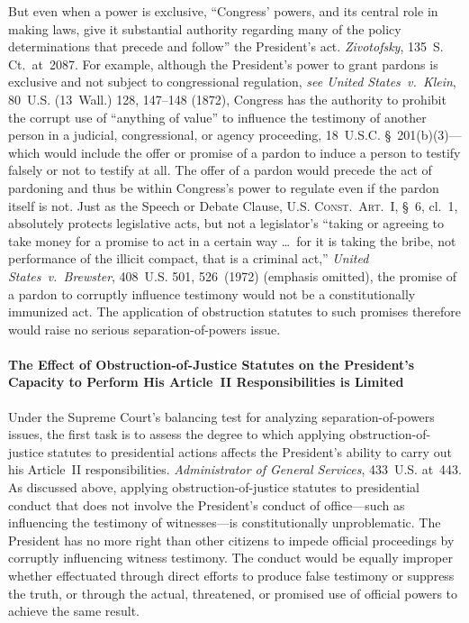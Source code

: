 But even when a power is exclusive, ``Congress' powers, and its central role in making laws, give it substantial authority regarding many of the policy determinations that precede and follow'' the President's act.
\textit{Zivotofsky}, 135~S. Ct.~at~2087.
For example, although the President's power to grant pardons is exclusive and not subject to congressional regulation, \textit{see United States~v.\ Klein}, 80~U.S. (13~Wall.) 128, 147--148 (1872), Congress has the authority to prohibit the corrupt use of ``anything of value'' to influence the testimony of another person in a judicial, congressional, or agency proceeding, 18~U.S.C. \S~201(b)(3)---which would include the offer or promise of a pardon to induce a person to testify falsely or not to testify at all.
The offer of a pardon would precede the act of pardoning and thus be within Congress's power to regulate even if the pardon itself is not.
Just as the Speech or Debate Clause, \textsc{U.S. Const.\ Art.~I}, \S~6, cl.~1, absolutely protects legislative acts, but not a legislator's ``taking or agreeing to take money for a promise to act in a certain way \dots\ for it is taking the bribe, not performance of the illicit compact, that is a criminal act,'' \textit{United States~v.\ Brewster}, 408~U.S. 501, 526~(1972) (emphasis omitted), the promise of a pardon to corruptly influence testimony would not be a constitutionally immunized act.
The application of obstruction statutes to such promises therefore would raise no serious separation-of-powers issue.

\paragraph{The Effect of Obstruction-of-Justice Statutes on the President's Capacity to Perform His Article~II Responsibilities is Limited}

Under the Supreme Court's balancing test for analyzing separation-of-powers issues, the first task is to assess the degree to which applying obstruction-of-justice statutes to presidential actions affects the President's ability to carry out his Article~II responsibilities.
\textit{Administrator of General Services}, 433~U.S. at~443.
As discussed above, applying obstruction-of-justice statutes to presidential conduct that does not involve the President's conduct of office---such as influencing the testimony of witnesses---is constitutionally unproblematic.
The President has no more right than other citizens to impede official proceedings by corruptly influencing witness testimony.
The conduct would be equally improper whether effectuated through direct efforts to produce false testimony or suppress the truth, or through the actual, threatened, or promised use of official powers to achieve the same result.

